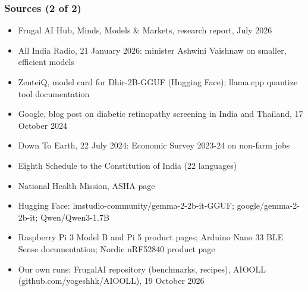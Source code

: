 \begin{frame}[fragile]\frametitle{Sources (2 of 2)}
\begin{itemize}\footnotesize
\item Frugal AI Hub, Minds, Models \& Markets, research report, July 2026
\item All India Radio, 21 January 2026: minister Ashwini Vaishnaw on smaller, efficient models
\item ZenteiQ, model card for Dhir-2B-GGUF (Hugging Face); llama.cpp quantize tool documentation
\item Google, blog post on diabetic retinopathy screening in India and Thailand, 17 October 2024
\item Down To Earth, 22 July 2024: Economic Survey 2023-24 on non-farm jobs
\item Eighth Schedule to the Constitution of India (22 languages)
\item National Health Mission, ASHA page
\item Hugging Face: lmstudio-community/gemma-2-2b-it-GGUF; google/gemma-2-2b-it; Qwen/Qwen3-1.7B
\item Raspberry Pi 3 Model B and Pi 5 product pages; Arduino Nano 33 BLE Sense documentation; Nordic nRF52840 product page
\item Our own runs: FrugalAI repository (benchmarks, recipes), AIOOLL (github.com/yogeshhk/AIOOLL), 19 October 2026
\end{itemize}
\end{frame}
